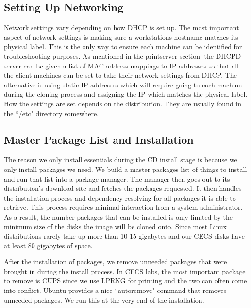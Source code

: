 \subsection{Setting Up Networking}
Network settings vary depending on how DHCP is set up.  The most important aspect of network settings is making sure a workstations hostname matches its physical label.  This is the only way to ensure each machine can be identified for troubleshooting purposes.  As mentioned in the printserver section, the DHCPD server can be given a list of MAC address mappings to IP addresses so that all the client machines can be set to take their network settings from DHCP.  The alternative is using static IP addresses which will require going to each machine during the cloning process and assigning the IP which matches the physical label.  How the settings are set depends on the distribution.  They are usually found in the ``/etc" directory somewhere.  

\subsection{Master Package List and Installation}
The reason we only install essentials during the CD install stage is because we only install packages we need.  We build a master packages list of things to install and run that list into a package manager.  The manager then goes out to its distribution's download site and fetches the packages requested.  It then handles the installation process and dependency resolving for all packages it is able to retrieve.  This process requires minimal interaction from a system administrator.  As a result, the number packages that can be installed is only limited by the minimum size of the disks the image will be cloned onto.  Since most Linux distributions rarely take up more than 10-15 gigabytes and our CECS disks have at least 80 gigabytes of space.  

After the installation of packages, we remove unneeded packages that were brought in during the install process.  In CECS labs, the most important package to remove is CUPS since we use LPRNG for printing and the two can often come into conflict. Ubuntu provides a nice ``autoremove" command that removes unneeded packages. We run this at the very end of the installation. 

